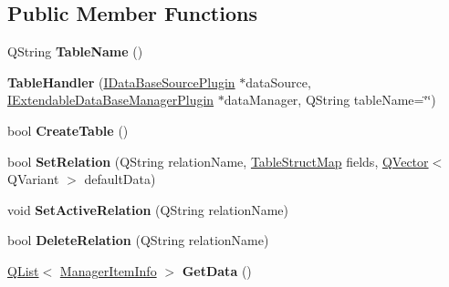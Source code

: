 \subsection*{Public Member Functions}
\begin{DoxyCompactItemize}
\item 
Q\+String {\bfseries Table\+Name} ()\hypertarget{class_table_handler_a20dc6faa1425f198209d56bb535b1a72}{}\label{class_table_handler_a20dc6faa1425f198209d56bb535b1a72}

\item 
{\bfseries Table\+Handler} (\hyperlink{class_i_data_base_source_plugin}{I\+Data\+Base\+Source\+Plugin} $\ast$data\+Source, \hyperlink{class_i_extendable_data_base_manager_plugin}{I\+Extendable\+Data\+Base\+Manager\+Plugin} $\ast$data\+Manager, Q\+String table\+Name=\char`\"{}\char`\"{})\hypertarget{class_table_handler_a74f015a8365c93a78de54748b9ad38d3}{}\label{class_table_handler_a74f015a8365c93a78de54748b9ad38d3}

\item 
bool {\bfseries Create\+Table} ()\hypertarget{class_table_handler_abea316ba4ae1d601fd2b36684c5de86d}{}\label{class_table_handler_abea316ba4ae1d601fd2b36684c5de86d}

\item 
bool {\bfseries Set\+Relation} (Q\+String relation\+Name, \hyperlink{class_q_map}{Table\+Struct\+Map} fields, \hyperlink{class_q_vector}{Q\+Vector}$<$ Q\+Variant $>$ default\+Data)\hypertarget{class_table_handler_a420f94195257d620752b2099679f7c24}{}\label{class_table_handler_a420f94195257d620752b2099679f7c24}

\item 
void {\bfseries Set\+Active\+Relation} (Q\+String relation\+Name)\hypertarget{class_table_handler_a46215bc7cc52ed769968c6bd0ce38f10}{}\label{class_table_handler_a46215bc7cc52ed769968c6bd0ce38f10}

\item 
bool {\bfseries Delete\+Relation} (Q\+String relation\+Name)\hypertarget{class_table_handler_a656e0c98391e7fe201c523542adc50a2}{}\label{class_table_handler_a656e0c98391e7fe201c523542adc50a2}

\item 
\hyperlink{class_q_list}{Q\+List}$<$ \hyperlink{class_i_extendable_data_base_manager_plugin_1_1_manager_data_item}{Manager\+Item\+Info} $>$ {\bfseries Get\+Data} ()\hypertarget{class_table_handler_af0b4da1a3d599f33d0ad6fadc150e664}{}\label{class_table_handler_af0b4da1a3d599f33d0ad6fadc150e664}


\end{DoxyCompactItemize}
